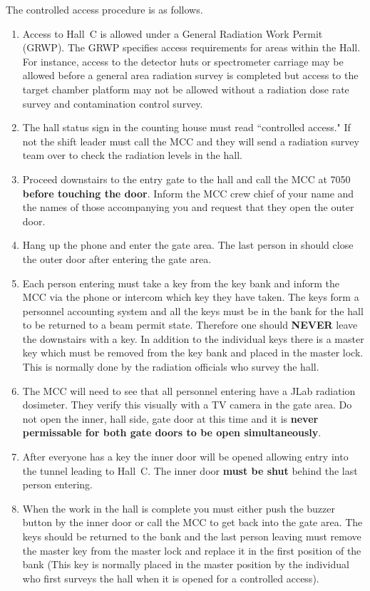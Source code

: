 The controlled access procedure is as follows.
\begin{enumerate}

\item{Access to Hall~C is allowed under a General  Radiation Work Permit (GRWP). The GRWP  specifies access requirements for areas within the Hall. For instance, access to the detector huts or spectrometer carriage may be allowed before a general area radiation survey is completed but access to the target chamber platform may not be allowed without a radiation dose rate survey and contamination control survey.}

\item{The hall status sign in the counting house must
read ``controlled access." If not the shift leader must call the MCC
and they will send a radiation survey team over to check the
radiation levels in the hall.}

\item{Proceed downstairs to the entry gate to the hall
and call the MCC at 7050 {\bf before touching the door}. Inform the
MCC crew chief of your name and the names of those accompanying you
and request that they open the outer door.}

\item{Hang up the phone and enter the gate area. The last
person in should close the outer door after entering the gate area.}

\item{Each person entering must take a key from the key bank
and inform the MCC via the phone or intercom which key they have taken.
The keys form a personnel accounting system and all the keys must
be in the bank for the hall to be returned to a beam permit state.
Therefore one should {\bf NEVER} leave the downstairs with a key.
In addition to the individual keys there is a master key which
must be removed from the key bank and placed in the master lock. This
is normally done by the radiation officials who survey the hall.}

\item{The MCC will need to see that all personnel entering have
a JLab radiation dosimeter. They verify this visually with a TV camera in the gate area.
Do not open the inner, hall side, gate door at this time and
it is {\bf never permissable for both gate doors to be open 
simultaneously}.}

\item{After everyone has a key the inner door will be opened
allowing entry into the tunnel leading to Hall~C.
The inner door {\bf must be shut} behind the last person entering.}

\item{When the work in the hall is complete you must
either push the buzzer button by the inner door or call the
MCC to get back into the gate area.
The keys should be returned to the bank and the last person leaving
must remove the master key from
the master lock and replace it in the first position of the
bank (This key is normally placed in the master position by the individual who
first surveys the hall when it is opened for a controlled access).}

\end{enumerate}

